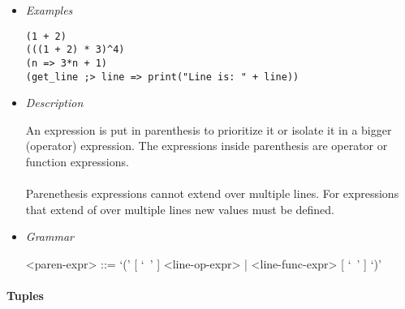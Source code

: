 \documentclass{article}
\begin{document}
\begin{itemize}

\item \textit{Examples}
\begin{verbatim}
(1 + 2)
(((1 + 2) * 3)^4)
(n => 3*n + 1)
(get_line ;> line => print("Line is: " + line))
\end{verbatim}

\item \textit{Description}

An expression is put in parenthesis to prioritize it or isolate it in a bigger
(operator) expression. The expressions inside parenthesis are operator
or function expressions.
\\\\
Parenethesis expressions cannot extend over multiple lines. For expressions
that extend of over multiple lines new values must be defined.

\item \textit{Grammar}
\begin{grammar}
<paren-expr> ::= `(' [ `\ ' ] <line-op-expr> | <line-func-expr> [ `\ ' ] `)'  
\end{grammar}

\end{itemize}

\paragraph{Tuples}
\end{document}
